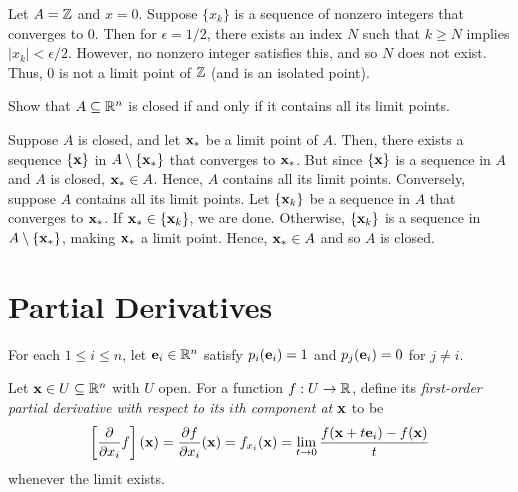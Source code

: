 \documentclass[letterpaper, twoside, 12pt]{book}
\begin{document}
\begin{solution}
    Let \(A = \mathbb Z\) and \(x = 0\). Suppose \(\{x_k\}\) is a sequence
    of nonzero integers that converges to \(0\). Then for \(\epsilon = 1/2\),
    there exists an index \(N\) such that \(k \geq N\) implies
    \(|x_k| < \epsilon/2\). However, no nonzero integer satisfies this,
    and so \(N\) does not exist. Thus, \(0\) is not a limit point of \(\mathbb Z\)
    (and is an isolated point).
\end{solution}

\begin{exercise}[12]
  Show that \(A\subseteq\mathbb R^n\) is closed if and only if it contains
  all its limit points.
\end{exercise}

\begin{solution}
    Suppose \(A\) is closed, and let \(\mathbf x_*\) be a limit point
    of \(A\). Then, there exists a sequence \(\{\mathbf x\}\) in \(A \setminus \{\mathbf x_*\}\)
    that converges to \(\mathbf x_*\). But since 
    \(\{\mathbf x\}\) is a sequence in \(A\) and \(A\) is closed,
    \(\mathbf x_* \in A\). Hence, \(A\) contains all its limit points.
    Conversely, suppose \(A\) contains all its limit points. Let
    \(\{\mathbf x_k\}\) be a sequence in \(A\) that converges to 
    \(\mathbf x_*\). If \(\mathbf x_* \in \{\mathbf x_k\}\), we are done. 
    Otherwise, \(\{\mathbf x_k\}\) is a sequence in \(A \setminus \{\mathbf x_*\}\),
    making \(\mathbf x_*\) a limit point. Hence, \(\mathbf x_* \in A\)
    and so \(A\) is closed.
\end{solution}


\section{Partial Derivatives}

\begin{definition}
  For each \(1\leq i\leq n\), let \(\mathbf e_i\in\mathbb R^n\)
  satisfy \(p_i(\mathbf e_i)=1\) and \(p_j(\mathbf e_i)=0\) for \(j\not=i\).
\end{definition}

\begin{definition}
  Let \(\mathbf x\in U\subseteq\mathbb R^n\) with \(U\) open. For a function
  \(f:U\to\mathbb R\), define its \textit{first-order
  partial derivative with respect to
  its \(i\)th component at \(\mathbf x\)} to be
  \[
    \left[\frac{\partial}{\partial x_i}f\right](\mathbf x)
      =
    \frac{\partial f}{\partial x_i}(\mathbf x)
      =
    f_{x_i}(\mathbf x)
      =
    \lim_{t\to 0}\frac{f(\mathbf x+t\mathbf e_i)-f(\mathbf x)}{t}
  \]
  whenever the limit exists.
\end{definition}
\end{document}
